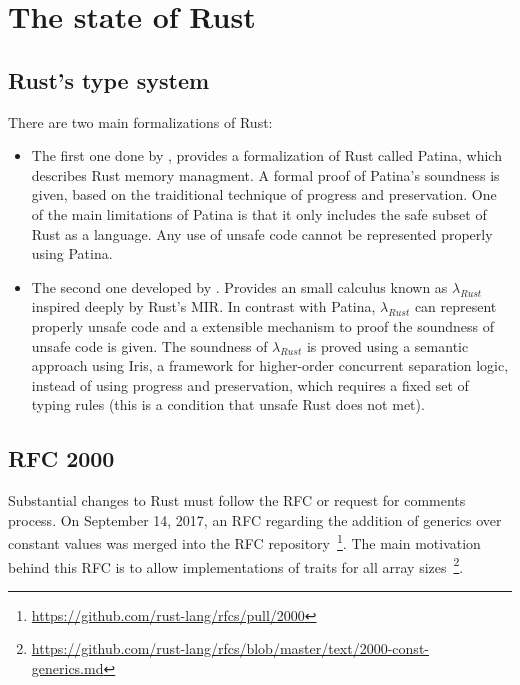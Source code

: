 \section{The state of Rust} 

\subsection{Rust's type system}

There are two main formalizations of Rust: 

\begin{itemize} 
    
    \item The first one done by \citet{reed}, provides a formalization of Rust
        called Patina, which describes Rust memory managment. A formal proof of
        Patina's soundness is given, based on the traiditional technique of
        progress and preservation. One of the main limitations of Patina is that
        it only includes the safe subset of Rust as a language. Any use of
        unsafe code cannot be represented properly using Patina.

    \item The second one developed by \citet{ralf}. Provides an small calculus
        known as $\lambda_{Rust}$ inspired deeply by Rust's MIR. In contrast
        with Patina, $\lambda_{Rust}$ can represent properly unsafe code and a
        extensible mechanism to proof the soundness of unsafe code is given. The
        soundness of $\lambda_{Rust}$ is proved using a semantic approach using
        Iris, a framework for higher-order concurrent separation logic, instead
        of using progress and preservation, which requires a fixed set of typing
        rules (this is a condition that unsafe Rust does not met).
        
\end{itemize}

\subsection{RFC 2000} 

\label{subsec:rfc2000}

Substantial changes to Rust must follow the RFC or request for comments process.
On September 14, 2017, an RFC regarding the addition of generics over constant
values was merged into the RFC
repository~\footnote{\url{https://github.com/rust-lang/rfcs/pull/2000}}. The
main motivation behind this RFC is to allow implementations of traits for all
array sizes~\footnote{\url{https://github.com/rust-lang/rfcs/blob/master/text/2000-const-generics.md}}. 

